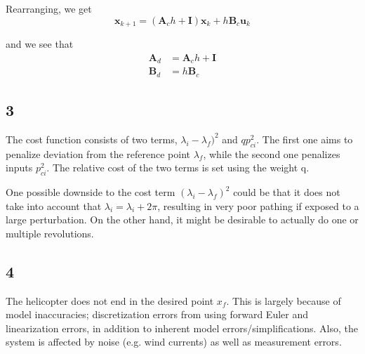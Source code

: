 Rearranging, we get
\begin{equation}
    \mathbf{x}_{k+1} = (\mathbf{A}_ch + \mathbf{I})\mathbf{x}_k + h\mathbf{B}_c\mathbf{u}_k
\end{equation}

and we see that
\begin{subequations}
    \begin{align}
        \mathbf{A}_d &= \mathbf{A}_ch+\mathbf{I} \\
        \mathbf{B}_d &= h\mathbf{B}_c
    \end{align}

\end{subequations}

\subsection{3}
The cost function  consists of two terms, $\lambda_i - \lambda_f)^2$ and $qp_{ci}^2$. The first one aims to penalize deviation from the reference point $\lambda_f$, while the second one penalizes inputs $p_{ci}^2$. The relative cost of the two terms is set using the weight q. 

One possible downside to the cost term $(\lambda_i - \lambda_f)^2$ could be that it does not take into account that $\lambda_i = \lambda_ i + 2\pi$, resulting in very poor pathing if exposed to a large perturbation. On the other hand, it might be desirable to actually do one or multiple revolutions.

\subsection{4}
The helicopter does not end in the desired point $x_f$. This is largely  because of model inaccuracies; discretization errors from using forward Euler and linearization errors, in addition to inherent model errors/simplifications. Also, the system is affected by noise (e.g. wind currents) as well as measurement errors. 